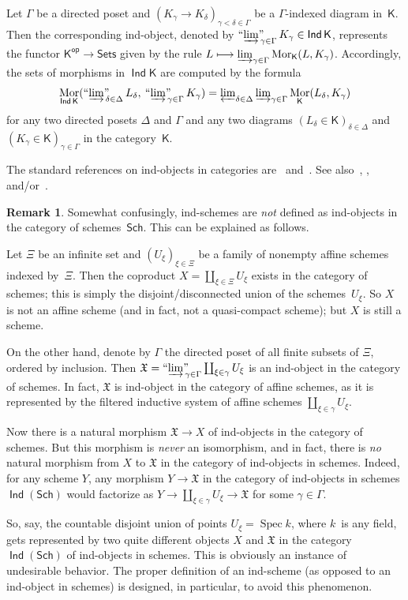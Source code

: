 \documentclass[12pt,a4paper]{amsart}
\newcommand{\+}{\protect\nobreakdash-}
\renewcommand{\:}{\colon}
\newcommand{\rarrow}{\longrightarrow}
\DeclareMathOperator{\Mor}{Mor}
\DeclareMathOperator{\Spec}{Spec}
\DeclareMathOperator{\Ind}{\mathsf{Ind}}
\newcommand{\Sets}{\mathsf{Sets}}
\newcommand{\Sch}{\mathsf{Sch}}
\newcommand{\sop}{\mathsf{op}}
\newcommand{\ilim}
 {\mathop{\text{\normalfont``$\varinjlim$''\!\!}}\nolimits}
\newcommand{\sK}{\mathsf K}
\newcommand{\fX}{\mathfrak X}
\theoremstyle{plain}
\theoremstyle{definition}
\newtheorem{rem}[thm]{Remark}
\begin{document}
 Let $\Gamma$ be a directed poset and
$(K_\gamma\to K_\delta)_{\gamma<\delta\in\Gamma}$ be
a $\Gamma$\+indexed diagram in~$\sK$.
 Then the corresponding ind-object, denoted by
$\ilim_{\gamma\in\Gamma}K_\gamma\in\Ind\sK$, represents the functor
$\sK^\sop\rarrow\Sets$ given by the rule
$L\longmapsto\varinjlim_{\gamma\in\Gamma}\Mor_\sK(L,K_\gamma)$.
 Accordingly, the sets of morphisms in $\Ind\sK$ are computed
by the formula
\begin{equation} \label{morphisms-of-ind-objects}
 \Mor_{\Ind\sK}(\ilim_{\delta\in\Delta}L_\delta,\>
 \ilim_{\gamma\in\Gamma}K_\gamma)=
 \varprojlim\nolimits_{\delta\in\Delta}
 \varinjlim\nolimits_{\gamma\in\Gamma}\Mor_\sK(L_\delta,K_\gamma)
\end{equation}
for any two directed posets $\Delta$ and $\Gamma$ and any two
diagrams $(L_\delta\in\sK)_{\delta\in\Delta}$ and
$(K_\gamma\in\sK)_{\gamma\in\Gamma}$ in the category~$\sK$.

 The standard references on ind-objects in categories
are~\cite[Section~I.8]{SGA4} and~\cite[Section~6]{KS}.
 See also~\cite[Section~1.1]{Psemten}, \cite[Section~9]{Pextop},
and/or~\cite{Hen}.

\begin{rem} \label{ind-objects-in-schemes-problematic-remark}
 Somewhat confusingly, ind-schemes are \emph{not} defined as
ind-objects in the category of schemes~$\Sch$.
 This can be explained as follows.

 Let $\Xi$ be an infinite set and $(U_\xi)_{\xi\in\Xi}$ be a family
of nonempty affine schemes indexed by~$\Xi$.
 Then the coproduct $X=\coprod_{\xi\in\Xi}U_\xi$ exists in
the category of schemes; this is simply the disjoint/disconnected
union of the schemes~$U_\xi$.
 So $X$ is not an affine scheme (and in fact, not a quasi-compact
scheme); but $X$ is still a scheme.

 On the other hand, denote by $\Gamma$ the directed poset of all
finite subsets of $\Xi$, ordered by inclusion.
 Then $\fX=\ilim_{\gamma\in\Gamma}\coprod_{\xi\in\gamma} U_\xi$ is
an ind-object in the category of schemes.
 In fact, $\fX$ is ind-object in the category of affine schemes, as it
is represented by the filtered inductive system of affine schemes
$\coprod_{\xi\in\gamma} U_\xi$.

 Now there is a natural morphism $\fX\rarrow X$ of ind-objects
in the category of schemes.
 But this morphism is \emph{never} an isomorphism, and in fact,
there is \emph{no} natural morphism from $X$ to $\fX$ in
the category of ind-objects in schemes.
 Indeed, for any scheme $Y$, any morphism $Y\rarrow\fX$ in
the category of ind-objects in schemes $\Ind(\Sch)$ would factorize
as $Y\rarrow\coprod_{\xi\in\gamma} U_\xi\rarrow\fX$ for some
$\gamma\in\Gamma$.

 So, say, the countable disjoint union of points $U_\xi=\Spec k$,
where $k$~is any field, gets represented by two quite different
objects $X$ and $\fX$ in the category $\Ind(\Sch)$ of ind-objects in
schemes.
 This is obviously an instance of undesirable behavior.
 The proper definition of an ind-scheme (as opposed to an ind-object
in schemes) is designed, in particular, to avoid this phenomenon.
\end{rem}
\end{document}
